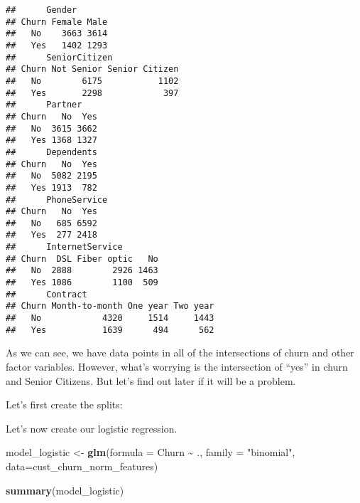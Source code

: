 \documentclass[
]{article}
\newenvironment{Shaded}{\begin{snugshade}}{\end{snugshade}}
\newcommand{\AttributeTok}[1]{\textcolor[rgb]{0.13,0.29,0.53}{#1}}
\newcommand{\ConstantTok}[1]{\textcolor[rgb]{0.56,0.35,0.01}{#1}}
\newcommand{\DecValTok}[1]{\textcolor[rgb]{0.00,0.00,0.81}{#1}}
\newcommand{\FunctionTok}[1]{\textcolor[rgb]{0.13,0.29,0.53}{\textbf{#1}}}
\newcommand{\NormalTok}[1]{#1}
\newcommand{\OtherTok}[1]{\textcolor[rgb]{0.56,0.35,0.01}{#1}}
\newcommand{\SpecialCharTok}[1]{\textcolor[rgb]{0.81,0.36,0.00}{\textbf{#1}}}
\newcommand{\StringTok}[1]{\textcolor[rgb]{0.31,0.60,0.02}{#1}}
\begin{document}
\begin{verbatim}
##      Gender
## Churn Female Male
##   No    3663 3614
##   Yes   1402 1293
##      SeniorCitizen
## Churn Not Senior Senior Citizen
##   No        6175           1102
##   Yes       2298            397
##      Partner
## Churn   No  Yes
##   No  3615 3662
##   Yes 1368 1327
##      Dependents
## Churn   No  Yes
##   No  5082 2195
##   Yes 1913  782
##      PhoneService
## Churn   No  Yes
##   No   685 6592
##   Yes  277 2418
##      InternetService
## Churn  DSL Fiber optic   No
##   No  2888        2926 1463
##   Yes 1086        1100  509
##      Contract
## Churn Month-to-month One year Two year
##   No            4320     1514     1443
##   Yes           1639      494      562
\end{verbatim}

As we can see, we have data points in all of the intersections of churn
and other factor variables. However, what's worrying is the intersection
of ``yes'' in churn and Senior Citizens. But let's find out later if it
will be a problem.

Let's first create the splits:

\begin{Shaded}
\end{Shaded}

Let's now create our logistic regression.

\begin{Shaded}
\begin{Highlighting}[]
\NormalTok{model\_logistic }\OtherTok{\textless{}{-}} \FunctionTok{glm}\NormalTok{(}\AttributeTok{formula =}\NormalTok{ Churn }\SpecialCharTok{\textasciitilde{}}\NormalTok{ ., }\AttributeTok{family =} \StringTok{"binomial"}\NormalTok{, }\AttributeTok{data=}\NormalTok{cust\_churn\_norm\_features)}

\FunctionTok{summary}\NormalTok{(model\_logistic)}
\end{Highlighting}
\end{Shaded}
\end{document}
